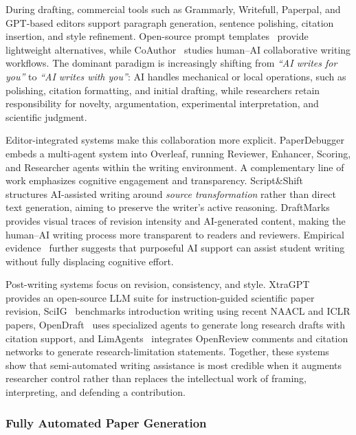 \documentclass{llmxive}
\begin{document}
During drafting, commercial tools such as Grammarly, Writefull, Paperpal, and GPT-based editors support paragraph generation, sentence polishing, citation insertion, and style refinement. Open-source prompt templates~\cite{leey21awesome} provide lightweight alternatives, while CoAuthor~\cite{coauthor2022} studies human--AI collaborative writing workflows. The dominant paradigm is increasingly shifting from \emph{``AI writes for you''} to \emph{``AI writes with you''}: AI handles mechanical or local operations, such as polishing, citation formatting, and initial drafting, while researchers retain responsibility for novelty, argumentation, experimental interpretation, and scientific judgment.

Editor-integrated systems make this collaboration more explicit. PaperDebugger~\cite{paperdebugger2025} embeds a multi-agent system into Overleaf, running Reviewer, Enhancer, Scoring, and Researcher agents within the writing environment. A complementary line of work emphasizes cognitive engagement and transparency. Script\&Shift~\cite{siddiqui2025scriptshift} structures AI-assisted writing around \emph{source transformation} rather than direct text generation, aiming to preserve the writer's active reasoning. DraftMarks~\cite{siddiqui2025draftmarks} provides visual traces of revision intensity and AI-generated content, making the human--AI writing process more transparent to readers and reviewers. Empirical evidence~\cite{siddiqui2025aiwriting} further suggests that purposeful AI support can assist student writing without fully displacing cognitive effort.

Post-writing systems focus on revision, consistency, and style. XtraGPT~\cite{xtragpt2025} provides an open-source LLM suite for instruction-guided scientific paper revision, SciIG~\cite{sciig2025} benchmarks introduction writing using recent NAACL and ICLR papers, OpenDraft~\cite{opendraft2025} uses specialized agents to generate long research drafts with citation support, and LimAgents~\cite{limagents2026} integrates OpenReview comments and citation networks to generate research-limitation statements. Together, these systems show that semi-automated writing assistance is most credible when it augments researcher control rather than replaces the intellectual work of framing, interpreting, and defending a contribution.



\subsubsection{Fully Automated Paper Generation}
\label{sec:writing_auto}
\end{document}
